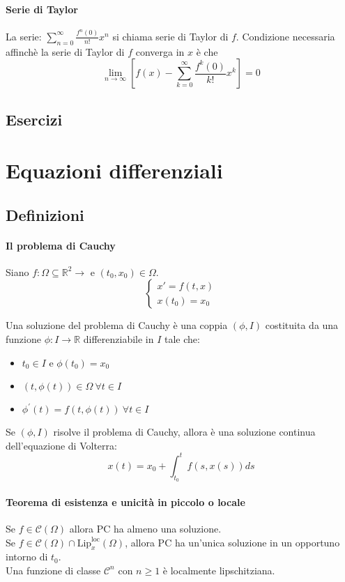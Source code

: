 \documentclass[a4paper,12pt]{article}
\newcommand{\cont}{\mathscr{C}}
\begin{document}
\paragraph{Serie di Taylor}
La serie:
$\displaystyle \sum_{n=0}^\infty \frac{f^{n}(0)}{n!} x^n$ si chiama serie di Taylor di $f$. Condizione necessaria affinchè la serie di Taylor di $f$ converga in  $x$ è che $$\lim_{n \to \infty}\displaystyle \left[ f(x) - \displaystyle  \sum_{k=0}^\infty \frac{f^{k}(0)}{k!}x^k \right] = 0 $$
\subsection{Esercizi}

\section{Equazioni differenziali}

\subsection{Definizioni}
\paragraph{Il problema di Cauchy}
Siano $f:\Omega \subseteq \mathbb{R}^2 \longrightarrow $ e $ \left(t_0,x_0\right) \in \Omega.$ 
$$\label{PC}\begin{cases} x'=f\left(t,x\right) \\ x\left(t_0\right)=x_0 \end{cases}$$

Una soluzione del problema di Cauchy è una coppia $\left( \phi , I \right)$ costituita da una funzione $\phi: I \longrightarrow \mathbb{R}$ differenziabile in $I$ tale che:
\begin{itemize}
\item $t_0 \in I$ e $ \phi\left(t_0\right)=x_0$
\item $ \left(t,\phi\left(t\right)\right) \in \Omega \ \forall t \in I$
\item $ \phi^{'}\left(t \right) = f\left(t,\phi\left(t\right)\right)\ \forall t \in I$
\end{itemize}

Se $\left(\phi,I\right)$ risolve il problema di Cauchy, allora è una soluzione continua dell'equazione di Volterra:
$$ x\left(t\right) = x_0 + \displaystyle\int^t_{t_0} f\left(s,x\left(s\right)\right) ds $$

\paragraph{Teorema di esistenza e unicità in piccolo o locale}
Se $f \in \cont \left(\Omega\right)$ allora PC ha almeno una soluzione. \\
Se $f \in \cont \left(\Omega\right) \cap \text{Lip}^{\text{loc}}_x\left(\Omega\right)$, allora PC ha un'unica soluzione in un opportuno intorno di $t_0$.\\
Una funzione di classe $\cont^n$ con $ n \geq 1 $ è localmente lipschitziana. 
\end{document}
